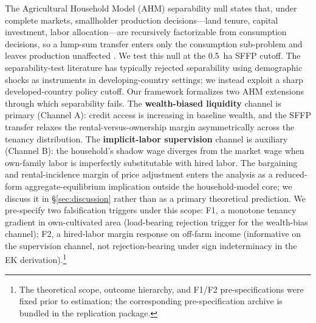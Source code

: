 \documentclass[12pt, a4paper]{article}
\begin{document}
The Agricultural Household Model (AHM) separability null states that, under complete markets, smallholder production decisions---land tenure, capital investment, labor allocation---are recursively factorizable from consumption decisions, so a lump-sum transfer enters only the consumption sub-problem and leaves production unaffected \citep{SinghSquireStrauss1986_ahm, deJanvryFafchampsSadoulet1991_peasant}. We test this null at the 0.5~ha SFFP cutoff. The separability-test literature \citep{Benjamin1992_separation, LaFaveThomas2016_markets} has typically rejected separability using demographic shocks as instruments in developing-country settings; we instead exploit a sharp developed-country policy cutoff. Our framework formalizes two AHM extensions through which separability fails. The \textbf{wealth-biased liquidity} channel \citep{CarterOlinto2003_liquidity} is primary (Channel A): credit access is increasing in baseline wealth, and the SFFP transfer relaxes the rental-versus-ownership margin asymmetrically across the tenancy distribution. The \textbf{implicit-labor supervision} channel \citep{EswaranKotwal1986_supervision} is auxiliary (Channel B): the household's shadow wage diverges from the market wage when own-family labor is imperfectly substitutable with hired labor. The bargaining and rental-incidence margin of price adjustment enters the analysis as a reduced-form aggregate-equilibrium implication outside the household-model core; we discuss it in \S\ref{sec:discussion} rather than as a primary theoretical prediction. We pre-specify two falsification triggers under this scope: F1, a monotone tenancy gradient in own-cultivated area (load-bearing rejection trigger for the wealth-bias channel); F2, a hired-labor margin response on off-farm income (informative on the supervision channel, not rejection-bearing under sign indeterminacy in the EK derivation).\footnote{The theoretical scope, outcome hierarchy, and F1/F2 pre-specifications were fixed prior to estimation; the corresponding pre-specification archive is bundled in the replication package.}
\end{document}
